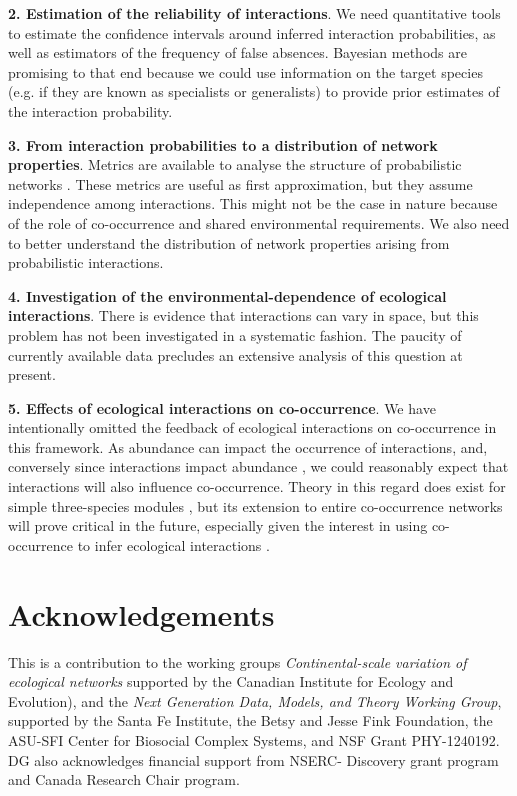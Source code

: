\documentclass[12pt]{article}
\begin{document}
\textbf{2. Estimation of the reliability of interactions}. We need
quantitative tools to estimate the confidence intervals around inferred
interaction probabilities, as well as estimators of the frequency of false
absences. Bayesian methods are promising to that end because we could use
information on the target species (e.g. if they are known as specialists or
generalists) to provide prior estimates of the interaction probability.

\textbf{3. From interaction probabilities to a distribution of network
properties}. Metrics are available to analyse the structure of probabilistic
networks \citep{Poisot2015c}. These metrics are useful as first approximation,
but they assume independence among interactions. This might not be the case in
nature because of the role of co-occurrence and shared environmental
requirements. We also need to better understand the distribution of network
properties arising from probabilistic interactions.

\textbf{4. Investigation of the environmental-dependence of ecological
interactions}. There is evidence that interactions can vary in space, but this
problem has not been investigated in a systematic fashion. The paucity of
currently available data precludes an extensive analysis of this question at
present.

\textbf{5. Effects of ecological interactions on co-occurrence}. We have
intentionally omitted the feedback of ecological interactions on co-occurrence
in this framework. As abundance can impact the occurrence of interactions, and,
conversely since interactions impact abundance \citep{Canard2014}, we could
reasonably expect that interactions will also influence co-occurrence. Theory
in this regard does exist for simple three-species modules
\citep{Cazelles2015}, but its extension to entire co-occurrence networks will
prove critical in the future, especially given the interest in using co-
occurrence to infer ecological interactions \citep{Morales-Castilla2015,
Morueta-Holme2016}.

\section*{Acknowledgements} 

This is a contribution to the working groups \emph {Continental-scale
variation of ecological networks} supported by the Canadian Institute for
Ecology and Evolution), and the \emph{Next Generation Data, Models, and
Theory Working Group}, supported by the Santa Fe Institute, the Betsy and
Jesse Fink Foundation, the ASU-SFI Center for Biosocial Complex Systems, and
NSF Grant PHY-1240192. DG also acknowledges financial support from NSERC-
Discovery grant program and Canada Research Chair program.
\end{document}
